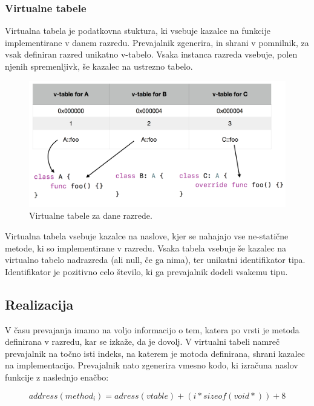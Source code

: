 \documentclass[a4paper, 12pt]{book}
\begin{document}
\subsubsection{Virtualne tabele}

Virtualna tabela je podatkovna stuktura, ki vsebuje kazalce na funkcije implementirane v danem razredu. Prevajalnik zgenerira, in shrani v pomnilnik, za vsak definiran razred unikatno v-tabelo. Vsaka instanca razreda vsebuje, polen njenih spremenljivk, še kazalec na ustrezno tabelo. 

\begin{figure}[h]
	\begin{center}
		\includegraphics[width=1\textwidth]{resources/v-tables.png}
	\end{center}
	\caption{Virtualne tabele za dane razrede.}
	\label{vtables}
\end{figure}

Virtualna tabela vsebuje kazalce na naslove, kjer se nahajajo vse ne-statične metode, ki so implementirane v razredu. Vsaka tabela vsebuje še kazalec na virtualno tabelo nadrazreda (ali null, če ga nima), ter unikatni identifikator tipa. Identifikator je pozitivno celo število, ki ga prevajalnik dodeli vsakemu tipu. \\

\subsection{Realizacija}

V času prevajanja imamo na voljo informacijo o tem, katera po vrsti je metoda definirana v razredu, kar se izkaže, da je dovolj. V virtualni tabeli namreč prevajalnik na točno isti indeks, na katerem je motoda definirana, shrani kazalec na implementacijo. Prevajalnik nato zgenerira vmesno kodo, ki izračuna naslov funkcije z naslednjo enačbo:

\[ address(method_i) = adress(vtable) + (i * sizeof(void*)) + 8 \]
\end{document}
